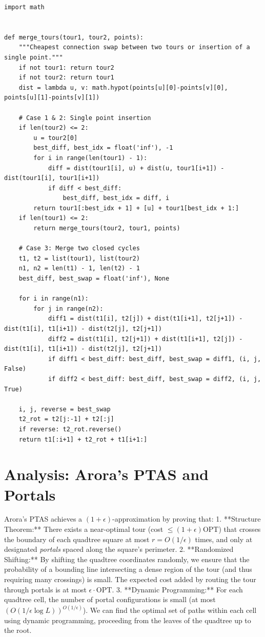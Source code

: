 \begin{lstlisting}[style=python, caption=Cheapest swap to merge tours]
import math


def merge_tours(tour1, tour2, points):
    """Cheapest connection swap between two tours or insertion of a single point."""
    if not tour1: return tour2
    if not tour2: return tour1
    dist = lambda u, v: math.hypot(points[u][0]-points[v][0], points[u][1]-points[v][1])
    
    # Case 1 & 2: Single point insertion
    if len(tour2) <= 2:
        u = tour2[0]
        best_diff, best_idx = float('inf'), -1
        for i in range(len(tour1) - 1):
            diff = dist(tour1[i], u) + dist(u, tour1[i+1]) - dist(tour1[i], tour1[i+1])
            if diff < best_diff:
                best_diff, best_idx = diff, i
        return tour1[:best_idx + 1] + [u] + tour1[best_idx + 1:]
    if len(tour1) <= 2:
        return merge_tours(tour2, tour1, points)
        
    # Case 3: Merge two closed cycles
    t1, t2 = list(tour1), list(tour2)
    n1, n2 = len(t1) - 1, len(t2) - 1
    best_diff, best_swap = float('inf'), None
    
    for i in range(n1):
        for j in range(n2):
            diff1 = dist(t1[i], t2[j]) + dist(t1[i+1], t2[j+1]) - dist(t1[i], t1[i+1]) - dist(t2[j], t2[j+1])
            diff2 = dist(t1[i], t2[j+1]) + dist(t1[i+1], t2[j]) - dist(t1[i], t1[i+1]) - dist(t2[j], t2[j+1])
            if diff1 < best_diff: best_diff, best_swap = diff1, (i, j, False)
            if diff2 < best_diff: best_diff, best_swap = diff2, (i, j, True)
            
    i, j, reverse = best_swap
    t2_rot = t2[j:-1] + t2[:j]
    if reverse: t2_rot.reverse()
    return t1[:i+1] + t2_rot + t1[i+1:]
\end{lstlisting}

\section{Analysis: Arora's PTAS and Portals}
Arora's PTAS achieves a $(1+\epsilon)$-approximation by proving that:
1.  **Structure Theorem:** There exists a near-optimal tour (cost $\le (1+\epsilon)\text{OPT}$) that crosses the boundary of each quadtree square at most $r = O(1/\epsilon)$ times, and only at designated \emph{portals} spaced along the square's perimeter.
2.  **Randomized Shifting:** By shifting the quadtree coordinates randomly, we ensure that the probability of a bounding line intersecting a dense region of the tour (and thus requiring many crossings) is small. The expected cost added by routing the tour through portals is at most $\epsilon \cdot \text{OPT}$.
3.  **Dynamic Programming:** For each quadtree cell, the number of portal configurations is small (at most $(O(1/\epsilon \log L))^{O(1/\epsilon)}$). We can find the optimal set of paths within each cell using dynamic programming, proceeding from the leaves of the quadtree up to the root.

